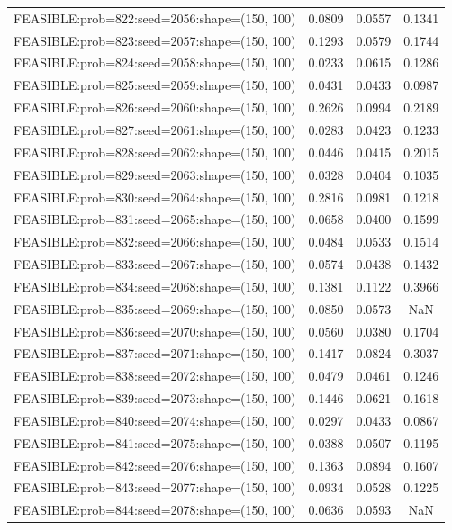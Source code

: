 \begin{longtable}{lccc}
FEASIBLE:prob=822:seed=2056:shape=(150, 100) & 0.0809 & 0.0557 & 0.1341 \\
FEASIBLE:prob=823:seed=2057:shape=(150, 100) & 0.1293 & 0.0579 & 0.1744 \\
FEASIBLE:prob=824:seed=2058:shape=(150, 100) & 0.0233 & 0.0615 & 0.1286 \\
FEASIBLE:prob=825:seed=2059:shape=(150, 100) & 0.0431 & 0.0433 & 0.0987 \\
FEASIBLE:prob=826:seed=2060:shape=(150, 100) & 0.2626 & 0.0994 & 0.2189 \\
FEASIBLE:prob=827:seed=2061:shape=(150, 100) & 0.0283 & 0.0423 & 0.1233 \\
FEASIBLE:prob=828:seed=2062:shape=(150, 100) & 0.0446 & 0.0415 & 0.2015 \\
FEASIBLE:prob=829:seed=2063:shape=(150, 100) & 0.0328 & 0.0404 & 0.1035 \\
FEASIBLE:prob=830:seed=2064:shape=(150, 100) & 0.2816 & 0.0981 & 0.1218 \\
FEASIBLE:prob=831:seed=2065:shape=(150, 100) & 0.0658 & 0.0400 & 0.1599 \\
FEASIBLE:prob=832:seed=2066:shape=(150, 100) & 0.0484 & 0.0533 & 0.1514 \\
FEASIBLE:prob=833:seed=2067:shape=(150, 100) & 0.0574 & 0.0438 & 0.1432 \\
FEASIBLE:prob=834:seed=2068:shape=(150, 100) & 0.1381 & 0.1122 & 0.3966 \\
FEASIBLE:prob=835:seed=2069:shape=(150, 100) & 0.0850 & 0.0573 &    NaN \\
FEASIBLE:prob=836:seed=2070:shape=(150, 100) & 0.0560 & 0.0380 & 0.1704 \\
FEASIBLE:prob=837:seed=2071:shape=(150, 100) & 0.1417 & 0.0824 & 0.3037 \\
FEASIBLE:prob=838:seed=2072:shape=(150, 100) & 0.0479 & 0.0461 & 0.1246 \\
FEASIBLE:prob=839:seed=2073:shape=(150, 100) & 0.1446 & 0.0621 & 0.1618 \\
FEASIBLE:prob=840:seed=2074:shape=(150, 100) & 0.0297 & 0.0433 & 0.0867 \\
FEASIBLE:prob=841:seed=2075:shape=(150, 100) & 0.0388 & 0.0507 & 0.1195 \\
FEASIBLE:prob=842:seed=2076:shape=(150, 100) & 0.1363 & 0.0894 & 0.1607 \\
FEASIBLE:prob=843:seed=2077:shape=(150, 100) & 0.0934 & 0.0528 & 0.1225 \\
FEASIBLE:prob=844:seed=2078:shape=(150, 100) & 0.0636 & 0.0593 &    NaN \\

\end{longtable}

